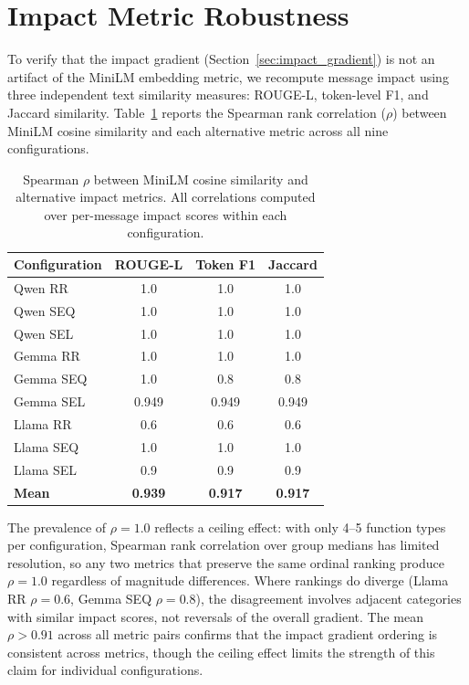 \section{Impact Metric Robustness}
\label{app:metric-robustness}

To verify that the impact gradient (Section~\ref{sec:impact_gradient}) is not an artifact of the MiniLM embedding metric, we recompute message impact using three independent text similarity measures: ROUGE-L, token-level F1, and Jaccard similarity. Table~\ref{tab:metric_robustness} reports the Spearman rank correlation ($\rho$) between MiniLM cosine similarity and each alternative metric across all nine configurations.

\begin{table}[htbp]
\centering
\caption{Spearman $\rho$ between MiniLM cosine similarity and alternative impact metrics. All correlations computed over per-message impact scores within each configuration.}
\label{tab:metric_robustness}
\small
\begin{tabular}{lccc}
\toprule
\textbf{Configuration} & \textbf{ROUGE-L} & \textbf{Token F1} & \textbf{Jaccard} \\
\midrule
Qwen RR   & 1.0 & 1.0 & 1.0 \\
Qwen SEQ  & 1.0 & 1.0 & 1.0 \\
Qwen SEL  & 1.0 & 1.0 & 1.0 \\
Gemma RR  & 1.0 & 1.0 & 1.0 \\
Gemma SEQ & 1.0 & 0.8 & 0.8 \\
Gemma SEL & 0.949 & 0.949 & 0.949 \\
Llama RR  & 0.6 & 0.6 & 0.6 \\
Llama SEQ & 1.0 & 1.0 & 1.0 \\
Llama SEL & 0.9 & 0.9 & 0.9 \\
\midrule
\textbf{Mean} & \textbf{0.939} & \textbf{0.917} & \textbf{0.917} \\
\bottomrule
\end{tabular}
\end{table}

The prevalence of $\rho = 1.0$ reflects a ceiling effect: with only 4--5 function types per configuration, Spearman rank correlation over group medians has limited resolution, so any two metrics that preserve the same ordinal ranking produce $\rho = 1.0$ regardless of magnitude differences. Where rankings do diverge (Llama RR $\rho = 0.6$, Gemma SEQ $\rho = 0.8$), the disagreement involves adjacent categories with similar impact scores, not reversals of the overall gradient. The mean $\rho > 0.91$ across all metric pairs confirms that the impact gradient ordering is consistent across metrics, though the ceiling effect limits the strength of this claim for individual configurations.

